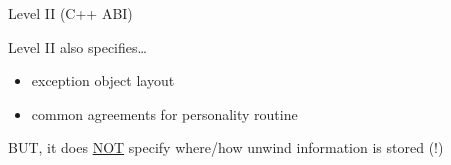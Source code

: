 \begin{frame}{Level II (C++ ABI)}
  \begin{block}{Level II also specifies\ldots{}}
    \begin{itemize}
    \item exception object layout

    \item common agreements for personality routine
    \end{itemize}
  \end{block}
  \vfill

  BUT, it does \underline{NOT} specify where/how unwind information is stored \alert{(!)}
\end{frame}
